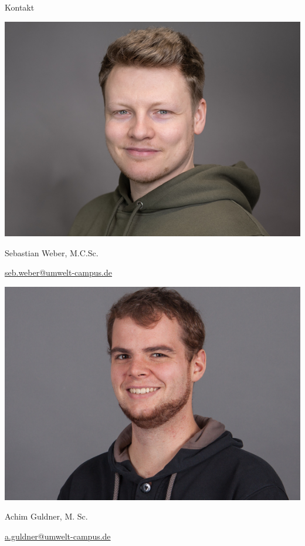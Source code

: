 \documentclass[10pt,aspectratio=169]{beamer}
\begin{document}
\begin{frame}{Kontakt}
\begin{minipage}{0.248\linewidth}
\vspace{0.5cm}

\includegraphics[width=0.9\linewidth]{assets/Sebastian.jpeg}

Sebastian Weber, M.C.Sc.

\href{mailto:seb.weber@umwelt-campus.de}{seb.weber@umwelt-campus.de}

\end{minipage}
\begin{minipage}{0.248\linewidth}

\vspace{0.2cm}

\includegraphics[width=0.9\linewidth]{assets/Achim.jpeg}

\fontsize{6}{6}\selectfont
Achim Guldner, M. Sc.

\href{mailto:a.guldner@umwelt-campus.de}{a.guldner@umwelt-campus.de}

\vspace{0.5cm}


\end{minipage}
\end{frame}
\end{document}
